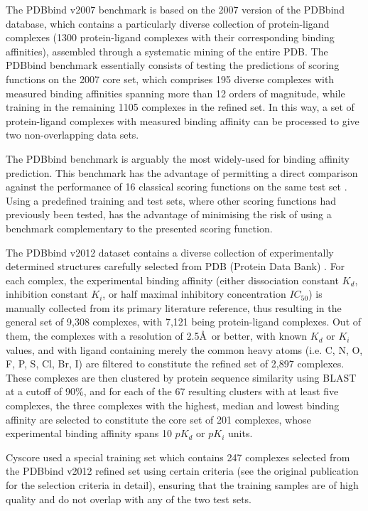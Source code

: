 \documentclass[journal=jacsat,manuscript=article]{achemso}
\begin{document}
The PDBbind v2007 benchmark is based on the 2007 version of the PDBbind database, which contains a particularly diverse collection of protein-ligand complexes (1300 protein-ligand complexes with their corresponding binding affinities), assembled through a systematic mining of the entire PDB. The PDBbind benchmark essentially consists of testing the predictions of scoring functions on the 2007 core set, which comprises 195 diverse complexes with measured binding affinities spanning more than 12 orders of magnitude, while training in the remaining 1105 complexes in the refined set. In this way, a set of protein-ligand complexes with measured binding affinity can be processed to give two non-overlapping data sets.

The PDBbind benchmark is arguably the most widely-used for binding affinity prediction. This benchmark has the advantage of permitting a direct comparison against the performance of 16 classical scoring functions on the same test set \cite{1313}. Using a predefined training and test sets, where other scoring functions had previously been tested, has the advantage of minimising the risk of using a benchmark complementary to the presented scoring function.

The PDBbind v2012 dataset contains a diverse collection of experimentally determined structures carefully selected from PDB (Protein Data Bank) \cite{540,537}. For each complex, the experimental binding affinity (either dissociation constant $K_d$, inhibition constant $K_i$, or half maximal inhibitory concentration $IC_{50}$) is manually collected from its primary literature reference, thus resulting in the general set of 9,308 complexes, with 7,121 being protein-ligand complexes. Out of them, the complexes with a resolution of 2.5\AA\ or better, with known $K_d$ or $K_i$ values, and with ligand containing merely the common heavy atoms (i.e. C, N, O, F, P, S, Cl, Br, I) are filtered to constitute the refined set of 2,897 complexes. These complexes are then clustered by protein sequence similarity using BLAST at a cutoff of 90\%, and for each of the 67 resulting clusters with at least five complexes, the three complexes with the highest, median and lowest binding affinity are selected to constitute the core set of 201 complexes, whose experimental binding affinity spans 10 $pK_d$ or $pK_i$ units.

Cyscore used a special training set which contains 247 complexes selected from the PDBbind v2012 refined set using certain criteria (see the original publication \cite{1372} for the selection criteria in detail), ensuring that the training samples are of high quality and do not overlap with any of the two test sets.
\end{document}

